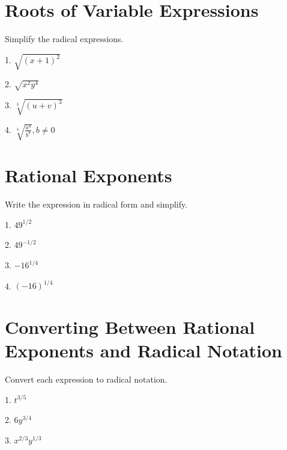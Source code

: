 \documentclass[12pt]{article}
\begin{document}
\section{Roots of Variable Expressions}
Simplify the radical expressions. 
\vspace{1.5em}

1. $\sqrt{(x+1)^{2}}$ 

\vspace{4.5em}

2. $\sqrt{x^{2}y^{4}}$ 

\vspace{4.5em} 

3. $\sqrt[3]{(u+v)^{3}}$ 

\vspace{4.5em} 

4. $\sqrt[4]{\frac{a^{4}}{b^{8}} }, b \neq 0$ 

\newpage 

\section{Rational Exponents} 
Write the expression in radical form and simplify. 
\vspace{1.5em} 

1. $49^{1/2}$ 

\vspace{4.5em} 

2. $49^{-1/2}$ 

\vspace{4.5em} 

3. $-16^{1/4}$ 

\vspace{4.5em} 

4. $(-16)^{1/4}$ 

\vspace{4.5em} 

\section{Converting Between Rational Exponents and Radical Notation} 
Convert each expression to radical notation. 
\vspace{1.5em} 

1. $t^{3/5}$ 

\vspace{4.5em} 

2. $6y^{3/4}$ 

\vspace{4.5em} 

3. $x^{2/3}y^{1/3}$ 
\end{document}
